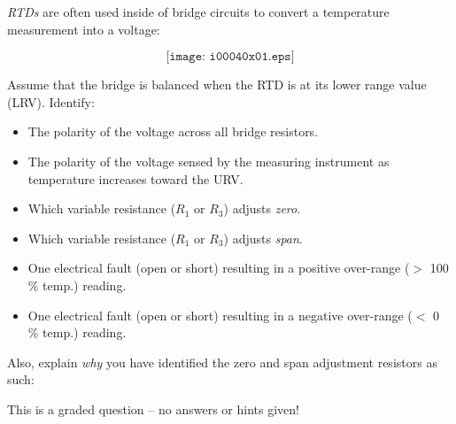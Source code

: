 

{\it RTDs} are often used inside of bridge circuits to convert a temperature measurement into a voltage:

$$\texttt{[image: i00040x01.eps]}$$

Assume that the bridge is balanced when the RTD is at its lower range value (LRV).  Identify:

\begin{itemize}
\item{} The polarity of the voltage across all bridge resistors.
\item{} The polarity of the voltage sensed by the measuring instrument as temperature increases toward the URV.
\item{} Which variable resistance ($R_1$ or $R_3$) adjusts {\it zero}.
\item{} Which variable resistance ($R_1$ or $R_3$) adjusts {\it span}.
\item{} One electrical fault (open or short) resulting in a positive over-range ($>$ 100 \% temp.) reading.
\item{} One electrical fault (open or short) resulting in a negative over-range ($<$ 0 \% temp.) reading.
\end{itemize}

Also, explain {\it why} you have identified the zero and span adjustment resistors as such:

\vfil 

\eject






This is a graded question -- no answers or hints given!











